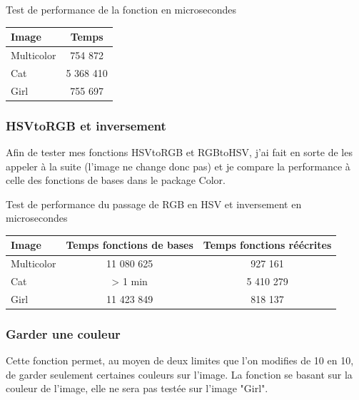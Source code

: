 \documentclass{article}
\begin{document}
\begin{center}
\medbreak
Test de performance de la fonction en microsecondes
\bigbreak
   \begin{tabular}{ | l | c | }
     \hline
     Image & Temps \\
     \hline
     Multicolor & 754 872 \\
     \hline
     Cat & 5 368 410 \\
     \hline
     Girl & 755 697 \\
     \hline
   \end{tabular}
 \end{center}
\bigbreak

\subsubsection{HSVtoRGB et inversement}

Afin de tester mes fonctions HSVtoRGB et RGBtoHSV, j'ai fait en sorte de les appeler à la suite (l'image ne change donc pas) et je compare la performance à celle des fonctions de bases dans le package Color.

\begin{center}
\medbreak
Test de performance du passage de RGB en HSV et inversement en microsecondes
\bigbreak
   \begin{tabular}{ | l | c | c |}
     \hline
     Image & Temps fonctions de bases & Temps fonctions réécrites \\
     \hline
     Multicolor & 11 080 625 & 927 161\\
     \hline
     Cat & > 1 min & 5 410 279 \\
     \hline
     Girl & 11 423 849 & 818 137 \\
     \hline
   \end{tabular}
 \end{center}
\bigbreak

\subsubsection{Garder une couleur}

Cette fonction permet, au moyen de deux limites que l'on modifies de 10 en 10, de garder seulement certaines couleurs sur l'image. La fonction se basant sur la couleur de l'image, elle ne sera pas testée sur l'image "Girl".
\end{document}
